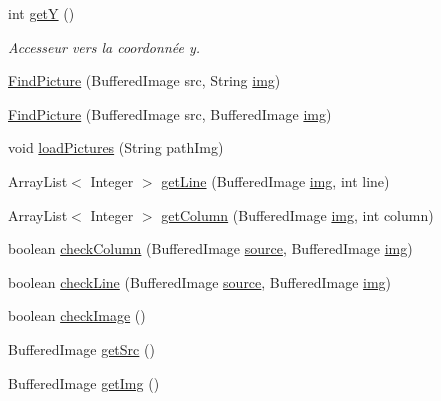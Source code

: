 \begin{DoxyCompactItemize}
int \hyperlink{classPictures_1_1FindPicture_a8f340bb45086f386e0a3b8f91bc34d7d}{get\+Y} ()
\begin{DoxyCompactList}\small\item\em Accesseur vers la coordonnée y. \end{DoxyCompactList}\item 
\hyperlink{classPictures_1_1FindPicture_a913868e0545034f6dca13d4b5b601d39}{Find\+Picture} (Buffered\+Image src, String \hyperlink{classPictures_1_1FindPicture_aae63a27df999ed48e5af4c680c3d75ad}{img})
\item 
\hyperlink{classPictures_1_1FindPicture_a86b1b0b63cac91983b0ce92a17eefaba}{Find\+Picture} (Buffered\+Image src, Buffered\+Image \hyperlink{classPictures_1_1FindPicture_aae63a27df999ed48e5af4c680c3d75ad}{img})
\item 
void \hyperlink{classPictures_1_1FindPicture_af0b1bc80dfd98aea65b056235702c3b4}{load\+Pictures} (String path\+Img)
\item 
Array\+List$<$ Integer $>$ \hyperlink{classPictures_1_1FindPicture_af6dbfb9eebba6ecaefb4c8c196cc3ccb}{get\+Line} (Buffered\+Image \hyperlink{classPictures_1_1FindPicture_aae63a27df999ed48e5af4c680c3d75ad}{img}, int line)
\item 
Array\+List$<$ Integer $>$ \hyperlink{classPictures_1_1FindPicture_a604c9cb11133f9910028abda35352255}{get\+Column} (Buffered\+Image \hyperlink{classPictures_1_1FindPicture_aae63a27df999ed48e5af4c680c3d75ad}{img}, int column)
\item 
boolean \hyperlink{classPictures_1_1FindPicture_ac0efebd74276c04a99d52535a4494337}{check\+Column} (Buffered\+Image \hyperlink{classPictures_1_1FindPicture_a97e21e6354d181ae52c8b33ff3968128}{source}, Buffered\+Image \hyperlink{classPictures_1_1FindPicture_aae63a27df999ed48e5af4c680c3d75ad}{img})
\item 
boolean \hyperlink{classPictures_1_1FindPicture_af05439ba5284ef81cdc0bc2ee4f76eac}{check\+Line} (Buffered\+Image \hyperlink{classPictures_1_1FindPicture_a97e21e6354d181ae52c8b33ff3968128}{source}, Buffered\+Image \hyperlink{classPictures_1_1FindPicture_aae63a27df999ed48e5af4c680c3d75ad}{img})
\item 
boolean \hyperlink{classPictures_1_1FindPicture_aad1e5b8e980b71a682633a78331a4579}{check\+Image} ()
\item 
Buffered\+Image \hyperlink{classPictures_1_1FindPicture_a7ffaa7ffcd58482dcc7050200a964608}{get\+Src} ()
\item 
Buffered\+Image \hyperlink{classPictures_1_1FindPicture_a8e72367088f376429ac47d29c8a3112f}{get\+Img} ()

\end{DoxyCompactItemize}
